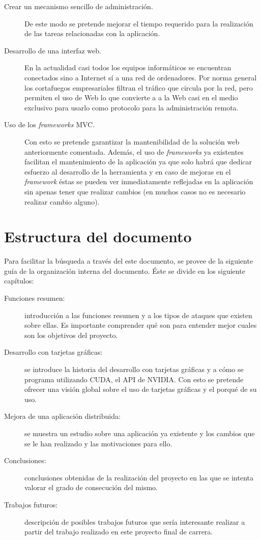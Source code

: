 \begin{description}
	\item[Crear un mecanismo sencillo de administración.] De este modo se pretende mejorar el tiempo requerido para la realización de las tareas relacionadas con la aplicación.
	
	\item[Desarrollo de una interfaz web.] En la actualidad casi todos los equipos informáticos se encuentran conectados sino a Internet sí a una red de ordenadores. Por norma general los cortafuegos empresariales filtran el tráfico que circula por la red, pero permiten el uso de Web lo que convierte a a la Web casi en el medio exclusivo para usarlo como protocolo para la administración remota.
	
	\item[Uso de los \emph{frameworks} MVC.] Con esto se pretende garantizar la mantenibilidad de la solución web anteriormente comentada. Además, el uso de \emph{frameworks} ya existentes facilitan el mantenimiento de la aplicación ya que solo habrá que dedicar esfuerzo al desarrollo de la herramienta y en caso de mejoras en el \emph{framework} éstas se pueden ver inmediatamente reflejadas en la aplicación sin apenas tener que realizar cambios (en muchos casos no es necesario realizar cambio alguno).
\end{description}

\section{Estructura del documento}

Para facilitar la búsqueda a través del este documento, se provee de la siguiente guía de la organización interna del documento. Éste se divide en los siguiente capítulos:

\begin{description}
	\item[Funciones resumen:] introducción a las funciones resumen y a los tipos de ataques que existen sobre ellas. Es importante comprender qué son para entender mejor cuales son los objetivos del proyecto.
	
	\item[Desarrollo con tarjetas gráficas:] se introduce la historia del desarrollo con tarjetas gráficas y a cómo se programa utilizando CUDA, el API de NVIDIA. Con esto se pretende ofrecer una visión global sobre el uso de tarjetas gráficas y el porqué de su uso.
	
	\item[Mejora de una aplicación distribuida:] se muestra un estudio sobre una aplicación ya existente y los cambios que se le han realizado y las motivaciones para ello.
	
	\item[Conclusiones:] conclusiones obtenidas de la realización del proyecto en las que se intenta valorar el grado de consecución del mismo.
	
	\item[Trabajos futuros:] descripción de posibles trabajos futuros que sería interesante realizar a partir del trabajo realizado en este proyecto final de carrera.
\end{description}
